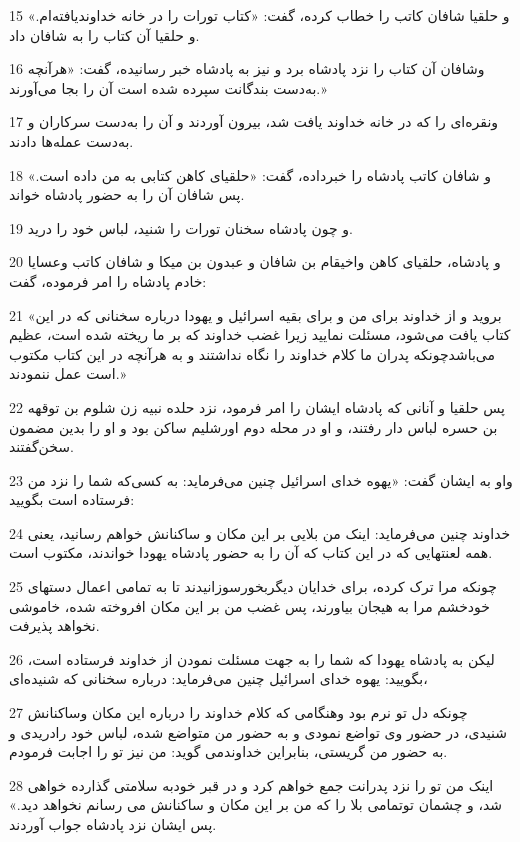 \par 15 و حلقیا شافان کاتب را خطاب کرده، گفت: «کتاب تورات را در خانه خداوندیافته‌ام.» و حلقیا آن کتاب را به شافان داد.
\par 16 وشافان آن کتاب را نزد پادشاه برد و نیز به پادشاه خبر رسانیده، گفت: «هر‌آنچه به‌دست بندگانت سپرده شده است آن را بجا می‌آورند.»
\par 17 ونقره‌ای را که در خانه خداوند یافت شد، بیرون آوردند و آن را به‌دست سرکاران و به‌دست عمله‌ها دادند.
\par 18 و شافان کاتب پادشاه را خبرداده، گفت: «حلقیای کاهن کتابی به من داده است.» پس شافان آن را به حضور پادشاه خواند.
\par 19 و چون پادشاه سخنان تورات را شنید، لباس خود را درید.
\par 20 و پادشاه، حلقیای کاهن واخیقام بن شافان و عبدون بن میکا و شافان کاتب وعسایا خادم پادشاه را امر فرموده، گفت:
\par 21 «بروید و از خداوند برای من و برای بقیه اسرائیل و یهودا درباره سخنانی که در این کتاب یافت می‌شود، مسئلت نمایید زیرا غضب خداوند که بر ما ریخته شده است، عظیم می‌باشدچونکه پدران ما کلام خداوند را نگاه نداشتند و به هر‌آنچه در این کتاب مکتوب است عمل ننمودند.»
\par 22 پس حلقیا و آنانی که پادشاه ایشان را امر فرمود، نزد حلده نبیه زن شلوم بن توقهه بن حسره لباس دار رفتند، و او در محله دوم اورشلیم ساکن بود و او را بدین مضمون سخن‌گفتند.
\par 23 واو به ایشان گفت: «یهوه خدای اسرائیل چنین می‌فرماید: به کسی‌که شما را نزد من فرستاده است بگویید:
\par 24 خداوند چنین می‌فرماید: اینک من بلایی بر این مکان و ساکنانش خواهم رسانید، یعنی همه لعنتهایی که در این کتاب که آن را به حضور پادشاه یهودا خواندند، مکتوب است.
\par 25 چونکه مرا ترک کرده، برای خدایان دیگربخور‌سوزانیدند تا به تمامی اعمال دستهای خودخشم مرا به هیجان بیاورند، پس غضب من بر این مکان افروخته شده، خاموشی نخواهد پذیرفت.
\par 26 لیکن به پادشاه یهودا که شما را به جهت مسئلت نمودن از خداوند فرستاده است، بگویید: یهوه خدای اسرائیل چنین می‌فرماید: درباره سخنانی که شنیده‌ای،
\par 27 چونکه دل تو نرم بود وهنگامی که کلام خداوند را درباره این مکان وساکنانش شنیدی، در حضور وی تواضع نمودی و به حضور من متواضع شده، لباس خود رادریدی و به حضور من گریستی، بنابراین خداوندمی گوید: من نیز تو را اجابت فرمودم.
\par 28 اینک من تو را نزد پدرانت جمع خواهم کرد و در قبر خودبه سلامتی گذارده خواهی شد، و چشمان توتمامی بلا را که من بر این مکان و ساکنانش می رسانم نخواهد دید.» پس ایشان نزد پادشاه جواب آوردند.

